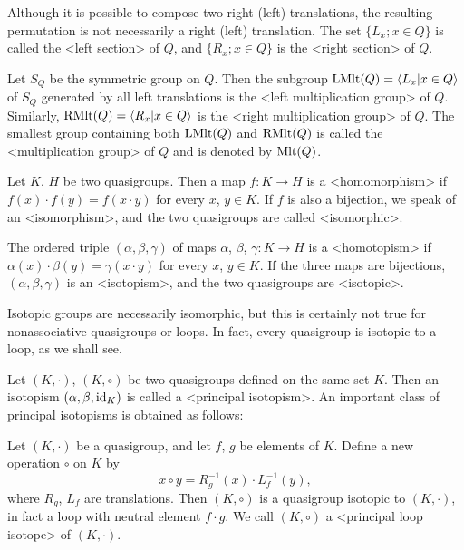 Although it is possible to compose two right (left) translations, the resulting
permutation is not necessarily a right (left) translation. The set $\{L_x;x\in
Q\}$ is called the <left section> of $Q$, and $\{R_x;x\in
Q\}$ is the <right section> of $Q$.

Let $S_Q$ be the symmetric group on $Q$. Then the subgroup
${\rm{LMlt}}(Q)=\langle L_x|x\in Q\rangle$ of $S_Q$ generated by all left
translations is the <left multiplication group> of $Q$. Similarly, ${\rm{RMlt}}(Q)= \langle R_x|x\in Q\rangle$ is the
<right multiplication group> of $Q$. The
smallest group containing both ${\rm{LMlt}}(Q)$ and ${\rm{RMlt}}(Q)$ is called
the <multiplication group> of $Q$ and is denoted by
${\rm{Mlt}}(Q)$.


Let $K$, $H$ be two quasigroups. Then a map $f:K\to H$ is a
<homomorphism> if $f(x)\cdot f(y)=f(x\cdot y)$ for every
$x$, $y\in K$. If $f$ is also a bijection, we speak of an
<isomorphism>, and the two quasigroups are called
<isomorphic>.

The ordered triple $(\alpha,\beta,\gamma)$ of maps $\alpha$, $\beta$,
$\gamma:K\to H$ is a <homotopism> if $\alpha(x)\cdot\beta(y)
= \gamma(x\cdot y)$ for every $x$, $y\in K$. If the three maps are bijections,
$(\alpha,\beta,\gamma)$ is an <isotopism>, and the two
quasigroups are <isotopic>.

Isotopic groups are necessarily isomorphic, but this is certainly not true for
nonassociative quasigroups or loops. In fact, every quasigroup is isotopic to a
loop, as we shall see.

Let $(K,\cdot)$, $(K,\circ)$ be two quasigroups defined on the same set $K$.
Then an isotopism $(\alpha,\beta,{\rm{id}}_K)$ is called a <principal
isotopism>. An important class of principal
isotopisms is obtained as follows:

Let $(K,\cdot)$ be a quasigroup, and let $f$, $g$ be elements of $K$. Define a
new operation $\circ$ on $K$ by
$$
    x\circ y = R_g^{-1}(x)\cdot L_f^{-1}(y),
$$
where $R_g$, $L_f$ are translations. Then $(K,\circ)$ is a quasigroup isotopic
to $(K,\cdot)$, in fact a loop with neutral element $f\cdot g$. We call
$(K,\circ)$ a <principal loop isotope> of
$(K,\cdot)$.

